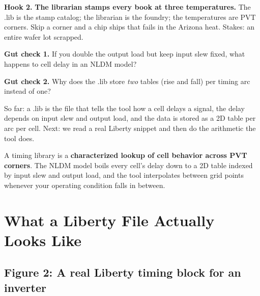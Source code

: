 \begin{hook}
\textbf{Hook 2.} \textbf{The librarian stamps every book at three temperatures.} The .lib is the stamp catalog; the librarian is the foundry; the temperatures are PVT corners. Skip a corner and a chip ships that fails in the Arizona heat. Stakes: an entire wafer lot scrapped.
\end{hook}

\begin{gut}
\textbf{Gut check 1.} If you double the output load but keep input slew fixed, what happens to cell delay in an NLDM model?
\end{gut}

\begin{gut}
\textbf{Gut check 2.} Why does the .lib store \emph{two} tables (rise and fall) per timing arc instead of one?
\end{gut}

\begin{pausebox}
So far: a .lib is the file that tells the tool how a cell delays a signal, the delay depends on input slew and output load, and the data is stored as a 2D table per arc per cell. Next: we read a real Liberty snippet and then do the arithmetic the tool does.
\end{pausebox}

\begin{keyidea}
A timing library is a \textbf{characterized lookup of cell behavior across PVT corners}. The NLDM model boils every cell's delay down to a 2D table indexed by input slew and output load, and the tool interpolates between grid points whenever your operating condition falls in between.
\end{keyidea}

\section{What a Liberty File Actually Looks Like}

\subsection*{Figure 2: A real Liberty timing block for an inverter}

